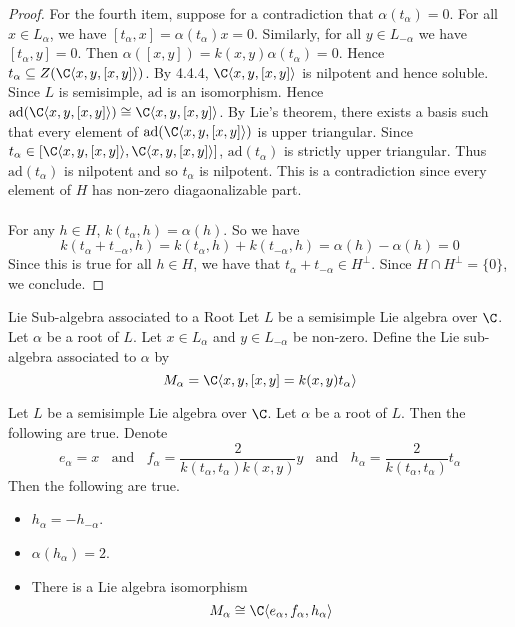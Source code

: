 \documentclass[a4paper]{article}
\begin{document}
\begin{lmm}{}{}
\begin{proof}
For the fourth item, suppose for a contradiction that $\alpha(t_\alpha)=0$. For all $x\in L_\alpha$, we have $[t_\alpha,x]=\alpha(t_\alpha)x=0$. Similarly, for all $y\in L_{-\alpha}$ we have $[t_\alpha,y]=0$. Then $\alpha([x,y])=k(x,y)\alpha(t_\alpha)=0$. Hence $t_\alpha\subseteq Z(\C\langle x,y, [x,y]\rangle)$. By 4.4.4, $\C\langle x,y,[x,y]\rangle$ is nilpotent and hence soluble. Since $L$ is semisimple, $\text{ad}$ is an isomorphism. Hence $\text{ad}(\C\langle x,y,[x,y]\rangle)\cong\C\langle x,y,[x,y]\rangle$. By Lie's theorem, there exists a basis such that every element of $\text{ad}(\C\langle x,y,[x,y]\rangle)$ is upper triangular. Since $t_\alpha\in[\C\langle x,y,[x,y]\rangle,\C\langle x,y,[x,y]\rangle]$, $\text{ad}(t_\alpha)$ is strictly upper triangular. Thus $\text{ad}(t_\alpha)$ is nilpotent and so $t_\alpha$ is nilpotent. This is a contradiction since every element of $H$ has non-zero diagaonalizable part. \\~\\

For any $h\in H$, $k(t_\alpha,h)=\alpha(h)$. So we have $$k(t_\alpha+t_{-\alpha},h)=k(t_\alpha,h)+k(t_{-\alpha},h)=\alpha(h)-\alpha(h)=0$$ Since this is true for all $h\in H$, we have that $t_\alpha+t_{-\alpha}\in H^\perp$. Since $H\cap H^\perp=\{0\}$, we conclude. 
\end{proof}
\end{lmm}

\begin{defn}{Lie Sub-algebra associated to a Root}{} Let $L$ be a semisimple Lie algebra over $\C$. Let $\alpha$ be a root of $L$. Let $x\in L_\alpha$ and $y\in L_{-\alpha}$ be non-zero. Define the Lie sub-algebra associated to $\alpha$ by $$M_\alpha=\C\langle x,y,[x,y]=k(x,y)t_\alpha\rangle$$
\end{defn}

\begin{prp}{}{} Let $L$ be a semisimple Lie algebra over $\C$. Let $\alpha$ be a root of $L$. Then the following are true. Denote $$e_\alpha=x\;\;\text{ and }\;\;f_\alpha=\frac{2}{k(t_\alpha,t_\alpha)k(x,y)}y\;\;\text{ and }\;\;h_\alpha=\frac{2}{k(t_\alpha,t_\alpha)}t_\alpha$$ Then the following are true. 
\begin{itemize}
\item $h_\alpha=-h_{-\alpha}$. 
\item $\alpha(h_\alpha)=2$. 
\item There is a Lie algebra isomorphism $$M_\alpha\cong\C\langle e_\alpha,f_\alpha,h_\alpha\rangle$$
\end{itemize}
\end{prp}
\end{document}
